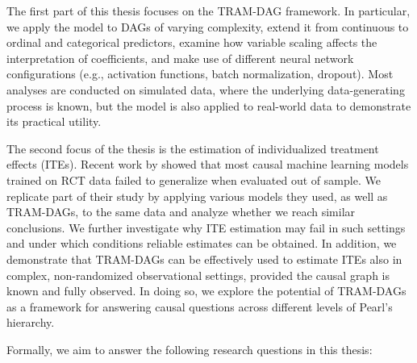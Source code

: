 The first part of this thesis focuses on the TRAM-DAG framework. In particular, we apply the model to DAGs of varying complexity, extend it from continuous to ordinal and categorical predictors, examine how variable scaling affects the interpretation of coefficients, and make use of different neural network configurations (e.g., activation functions, batch normalization, dropout). Most analyses are conducted on simulated data, where the underlying data-generating process is known, but the model is also applied to real-world data to demonstrate its practical utility.

The second focus of the thesis is the estimation of individualized treatment effects (ITEs). Recent work by \citet{chen2025} showed that most causal machine learning models trained on RCT data failed to generalize when evaluated out of sample. We replicate part of their study by applying various models they used, as well as TRAM-DAGs, to the same data and analyze whether we reach similar conclusions. We further investigate why ITE estimation may fail in such settings and under which conditions reliable estimates can be obtained. In addition, we demonstrate that TRAM-DAGs can be effectively used to estimate ITEs also in complex, non-randomized observational settings, provided the causal graph is known and fully observed. In doing so, we explore the potential of TRAM-DAGs as a framework for answering causal questions across different levels of Pearl's hierarchy.

\medskip

Formally, we aim to answer the following research questions in this thesis:

